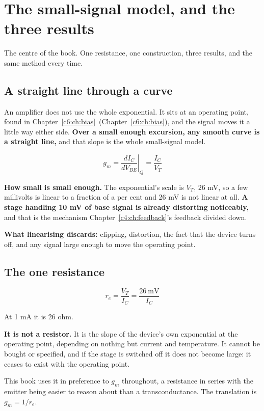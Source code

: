 
\section{The small-signal model, and the three results}
\label{c7:app:a}

The centre of the book. One resistance, one construction, three results, and the same method every time.

\subsection{A straight line through a curve}
\label{c7:sec:a1}
An amplifier does not use the whole exponential. It sits at an operating point, found in Chapter~\ref{c6:ch:bias}~(Chapter~\ref{c6:ch:bias}), and the signal moves it a little way either side. \textbf{Over a small enough excursion, any smooth curve is a straight line,} and that slope is the whole small-signal model.

\[
  g_m = \left.\frac{dI_C}{dV_{BE}}\right|_{Q} = \frac{I_C}{V_T}
\]

\textbf{How small is small enough.} The exponential's scale is $V_T$, 26 mV, so a few millivolts is linear to a fraction of a per cent and 26 mV is not linear at all. \textbf{A stage handling 10 mV of base signal is already distorting noticeably,} and that is the mechanism Chapter~\ref{c4:ch:feedback}'s feedback divided down.

\textbf{What linearising discards:} clipping, distortion, the fact that the device turns off, and any signal large enough to move the operating point.

\subsection{The one resistance}
\label{c7:sec:a2}
\[
  r_e = \frac{V_T}{I_C} = \frac{26\ \text{mV}}{I_C}
\]

At 1 mA it is 26 ohm.

\textbf{It is not a resistor.} It is the slope of the device's own exponential at the operating point, depending on nothing but current and temperature. It cannot be bought or specified, and if the stage is switched off it does not become large: it ceases to exist with the operating point.

This book uses it in preference to $g_m$ throughout, a resistance in series with the emitter being easier to reason about than a transconductance. The translation is $g_m = 1/r_e$.

